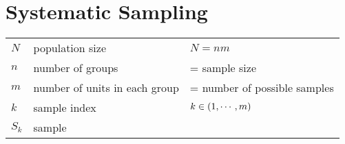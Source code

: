 \section{Systematic Sampling \cite{statistics/book/Statistics-for-Data-Scientists/Maurits-Kaptein}}\label{Sampling Plans/Representative Sampling/Systematic Sampling}

\begin{table}[H]
    \centering
    \begin{tabular}{l l l}
        $N$ & population size & $N=nm$\\
        $n$ & number of groups & = sample size \\
        $m$ & number of units in each group & = number of possible samples\\
        $k$ & sample index & $k \in \left(1,\cdots,m\right)$ \\
        $S_k$ & sample & \\
    \end{tabular}
\end{table}

